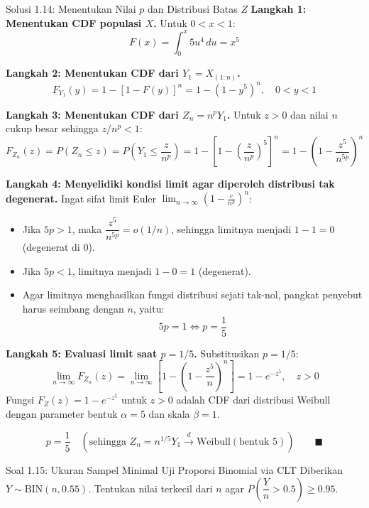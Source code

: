\documentclass[10pt,twoside]{article}
\begin{document}
\begin{solbox}{Solusi 1.14: Menentukan Nilai $p$ dan Distribusi Batas $Z$}
\textbf{Langkah 1: Menentukan CDF populasi $X$.}
Untuk $0 < x < 1$:
\[
F(x) = \int_0^x 5u^4 \, du = x^5
\]

\textbf{Langkah 2: Menentukan CDF dari $Y_1 = X_{(1:n)}$.}
\[
F_{Y_1}(y) = 1 - [1 - F(y)]^n = 1 - (1 - y^5)^n, \quad 0 < y < 1
\]

\textbf{Langkah 3: Menentukan CDF dari $Z_n = n^p Y_1$.}
Untuk $z > 0$ dan nilai $n$ cukup besar sehingga $z/n^p < 1$:
\[
F_{Z_n}(z) = P(Z_n \le z) = P\left(Y_1 \le \frac{z}{n^p}\right) = 1 - \left[1 - \left(\frac{z}{n^p}\right)^5\right]^n = 1 - \left(1 - \frac{z^5}{n^{5p}}\right)^n
\]

\textbf{Langkah 4: Menyelidiki kondisi limit agar diperoleh distribusi tak degenerat.}
Ingat sifat limit Euler $\lim_{n \to \infty} \left(1 - \frac{c}{n^k}\right)^n$:
\begin{itemize}
  \item Jika $5p > 1$, maka $\dfrac{z^5}{n^{5p}} = o(1/n)$, sehingga limitnya menjadi $1 - 1 = 0$ (degenerat di 0).
  \item Jika $5p < 1$, limitnya menjadi $1 - 0 = 1$ (degenerat).
  \item Agar limitnya menghasilkan fungsi distribusi sejati tak-nol, pangkat penyebut harus seimbang dengan $n$, yaitu:
  \[
  5p = 1 \iff p = \frac{1}{5}
  \]
\end{itemize}

\textbf{Langkah 5: Evaluasi limit saat $p = 1/5$.}
Substitusikan $p = 1/5$:
\[
\lim_{n \to \infty} F_{Z_n}(z) = \lim_{n \to \infty} \left[1 - \left(1 - \frac{z^5}{n}\right)^n\right] = 1 - e^{-z^5}, \quad z > 0
\]
Fungsi $F_Z(z) = 1 - e^{-z^5}$ untuk $z > 0$ adalah CDF dari distribusi Weibull dengan parameter bentuk $\alpha = 5$ dan skala $\beta = 1$.

\[
\boxed{p = \frac{1}{5} \quad \left(\text{sehingga } Z_n = n^{1/5} Y_1 \xrightarrow{d} \text{Weibull}(\text{bentuk } 5)\right)} \qquad \blacksquare
\]
\end{solbox}

\begin{soalbox}{Soal 1.15: Ukuran Sampel Minimal Uji Proporsi Binomial via CLT}
Diberikan $Y \sim \text{BIN}(n, 0.55)$. Tentukan nilai terkecil dari $n$ agar $P\left(\dfrac{Y}{n} > 0.5\right) \ge 0.95$.
\end{soalbox}
\end{document}

